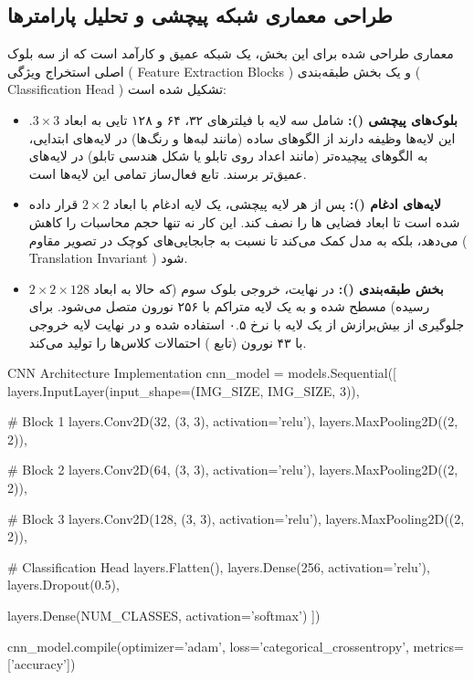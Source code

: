 \documentclass{article}
\begin{document}
\subsection{طراحی معماری شبکه پیچشی و تحلیل پارامترها}
معماری طراحی شده برای این بخش، یک شبکه عمیق و کارآمد است که از سه بلوک اصلی استخراج ویژگی ( Feature Extraction Blocks ) و یک بخش طبقه‌بندی ( Classification Head ) تشکیل شده است:
\begin{itemize}
	\item \textbf{بلوک‌های پیچشی ():} شامل سه لایه با فیلترهای ۳۲، ۶۴ و ۱۲۸ تایی به ابعاد $3 \times 3$. این لایه‌ها وظیفه دارند از الگوهای ساده (مانند لبه‌ها و رنگ‌ها) در لایه‌های ابتدایی، به الگوهای پیچیده‌تر (مانند اعداد روی تابلو یا شکل هندسی تابلو) در لایه‌های عمیق‌تر برسند. تابع فعال‌ساز تمامی این لایه‌ها  است.
	\item \textbf{لایه‌های ادغام ():} پس از هر لایه پیچشی، یک لایه ادغام با ابعاد $2 \times 2$ قرار داده شده است تا ابعاد فضایی ها را نصف کند. این کار نه تنها حجم محاسبات را کاهش می‌دهد، بلکه به مدل کمک می‌کند تا نسبت به جابجایی‌های کوچک در تصویر مقاوم ( Translation Invariant ) شود.
	\item \textbf{بخش طبقه‌بندی ():} در نهایت، خروجی بلوک سوم (که حالا به ابعاد $2 \times 2 \times 128$ رسیده) مسطح شده و به یک لایه متراکم با ۲۵۶ نورون متصل می‌شود. برای جلوگیری از بیش‌برازش از یک لایه  با نرخ ۰.۵ استفاده شده و در نهایت لایه خروجی با ۴۳ نورون (تابع ) احتمالات کلاس‌ها را تولید می‌کند.
\end{itemize}

\begin{latin}
	\begin{vscodewindow}{CNN Architecture Implementation}
cnn_model = models.Sequential([
    layers.InputLayer(input_shape=(IMG_SIZE, IMG_SIZE, 3)),
    
    # Block 1
    layers.Conv2D(32, (3, 3), activation='relu'),
    layers.MaxPooling2D((2, 2)),
    
    # Block 2
    layers.Conv2D(64, (3, 3), activation='relu'),
    layers.MaxPooling2D((2, 2)),
    
    # Block 3
    layers.Conv2D(128, (3, 3), activation='relu'),
    layers.MaxPooling2D((2, 2)),
    
    # Classification Head
    layers.Flatten(),
    layers.Dense(256, activation='relu'),
    layers.Dropout(0.5),
    
    layers.Dense(NUM_CLASSES, activation='softmax')
])

cnn_model.compile(optimizer='adam', 
    loss='categorical_crossentropy', 
    metrics=['accuracy'])
	\end{vscodewindow}
\end{latin}
\end{document}
